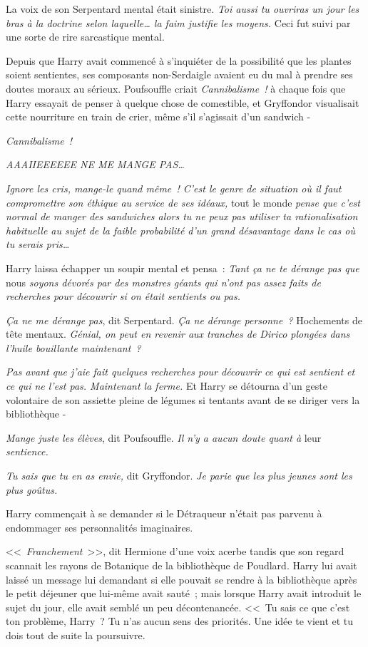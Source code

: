 La voix de son Serpentard mental était sinistre. \emph{Toi aussi tu ouvriras un jour les bras à la doctrine selon laquelle… la faim justifie les moyens.} Ceci fut suivi par une sorte de rire sarcastique mental.

Depuis que Harry avait commencé à s'inquiéter de la possibilité que les plantes soient sentientes, ses composants non-Serdaigle avaient eu du mal à prendre ses doutes moraux au sérieux. Poufsouffle criait \emph{Cannibalisme~!} à chaque fois que Harry essayait de penser à quelque chose de comestible, et Gryffondor visualisait cette nourriture en train de crier, même s'il s'agissait d'un sandwich -

\emph{Cannibalisme~!}

\emph{AAAIIEEEEEE NE ME MANGE PAS…}

\emph{Ignore les cris, mange-le quand même~! C'est le genre de situation où il faut compromettre son éthique au service de ses idéaux,} tout le monde \emph{pense que c'est normal de manger des sandwiches alors tu ne peux pas utiliser ta rationalisation habituelle au sujet de la faible probabilité d'un grand désavantage dans le cas où tu serais pris…}

Harry laissa échapper un soupir mental et pensa~: \emph{Tant ça ne te dérange pas que} nous \emph{soyons dévorés par des monstres géants qui n'ont pas assez faits de recherches pour découvrir si on était sentients ou pas.}

\emph{Ça ne me dérange pas}, dit Serpentard. \emph{Ça ne dérange personne~?} Hochements de tête mentaux. \emph{Génial, on peut en revenir aux tranches de Dirico plongées dans l'huile bouillante maintenant~?}

\emph{Pas avant que j'aie fait quelques recherches pour découvrir ce qui est sentient et ce qui ne l'est pas. Maintenant la ferme.} Et Harry se détourna d'un geste volontaire de son assiette pleine de légumes si tentants avant de se diriger vers la bibliothèque -

\emph{Mange juste les élèves}, dit Poufsouffle. \emph{Il n'y a aucun doute quant à} leur \emph{sentience.}

\emph{Tu sais que tu en as envie,} dit Gryffondor. \emph{Je parie que les plus jeunes sont les plus goûtus.}

Harry commençait à se demander si le Détraqueur n'était pas parvenu à endommager ses personnalités imaginaires.

\later

<<~\emph{Franchement}~>>, dit Hermione d'une voix acerbe tandis que son regard scannait les rayons de Botanique de la bibliothèque de Poudlard. Harry lui avait laissé un message lui demandant si elle pouvait se rendre à la bibliothèque après le petit déjeuner que lui-même avait sauté~; mais lorsque Harry avait introduit le sujet du jour, elle avait semblé un peu décontenancée. <<~Tu sais ce que c'est ton problème, Harry~? Tu n'as aucun sens des priorités. Une idée te vient et tu dois tout de suite la poursuivre.

